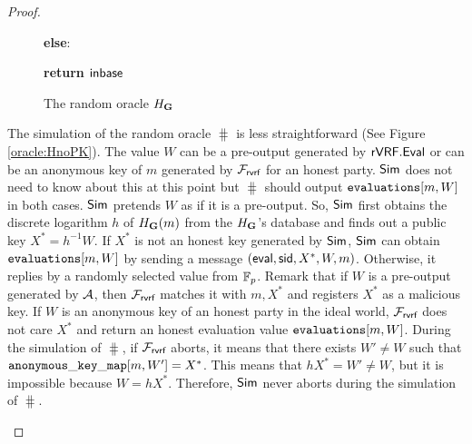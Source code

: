 \begin{proof}
\begin{itemize}
\begin{figure}
{{					
					
					
					
					
					\textbf{else}:
					
					
					
					\textbf{return $ {\mathsf{inbase}}$}
					
			}}	
			\caption{The random oracle $ H_{\mathbf{G}} $}
			\label{oracle:HgnoPK}
		\end{figure}
		The simulation of the random oracle $ \hash $ is less straightforward (See Figure \ref{oracle:HnoPK}).
		The value $ W $ can be a pre-output generated by $ {\mathsf{rVRF}}.{\mathsf{Eval}} $ or can be an anonymous key of  $ m $ generated by $ \mathcal{F}_{\textsf{rvrf}} $ for an honest party. $ \mathsf{Sim} $ does not need to know about this at this point but $ \hash $ should output $ \texttt{evaluations}[m,W] $ in both cases.	 
		$ \mathsf{Sim} $ pretends $ W $ as if it is a pre-output. So, $ \mathsf{Sim} $ first obtains the discrete logarithm $ h $ of $ H_{\mathbf{G}}(m) $ from the $ H_{\mathbf{G}} $'s database and finds out a public key $ X^* = h^{-1}W $.    
		If $ X^*$ is not an honest key generated by $ \mathsf{Sim} $, $ \mathsf{Sim} $ can obtain $ \texttt{evaluations}[m,W] $ by sending a message $ (\mathsf{eval}, \textsf{sid},X^*,W,m) $.
		Otherwise, it replies by a randomly selected value from $ \mathbb{F}_p $. Remark that
		if $ W $ is a pre-output generated by $ \mathcal{A} $, then $ \mathcal{F}_{\textsf{rvrf}} $ matches it with $ m, X^* $ and registers $ X^* $ as a malicious key. If $ W $ is an anonymous key of an honest party in the ideal world, $ \mathcal{F}_{\textsf{rvrf}} $ does not care $ X^* $ and return an honest evaluation value $ \texttt{evaluations}[m,W] $.
		During the simulation of $ \hash $, if $ \mathcal{F}_{\textsf{rvrf}} $ aborts, it means that there exists $ W' \neq W $ such that $ \mathtt{anonymous\_key\_map}[m,W'] = X^* $. This means that $ hX^* = W' \neq W  $, but it is impossible because $ W = hX^* $. Therefore, $ \mathsf{Sim} $ never aborts during the simulation of $ \hash $.
		

\end{itemize}
\end{proof}
